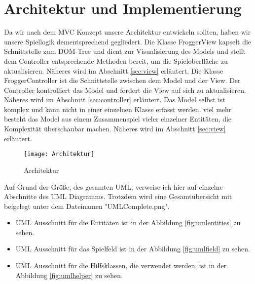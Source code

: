 \documentclass[a4paper,10pt]{report}
\begin{document}

    \chapter{Architektur und Implementierung}
     
	Da wir nach dem MVC Konzept unsere Architektur entwickeln sollten, haben wir unsere Spiellogik dementsprechend gegliedert. 
	\newline \newline	
	Die Klasse FroggerView kapselt die Schnittstelle zum DOM-Tree und dient zur Visualisierung des Models und stellt dem Controller 
	entsprechende Methoden bereit, um die Spieloberfläche zu aktualisieren. Näheres wird im Abschnitt \ref{sec:view} erläutert.
    \newline \newline	
	Die Klasse FroggerController ist die Schnittstelle zwischen dem Model und der View. Der Controller kontrolliert das Model und fordert 
	die View auf sich zu aktualisieren. Näheres wird im Abschnitt \ref{sec:controller} erläutert.
	\newline \newline 
	Das Model selbst ist komplex und kann nicht in einer einzelnen Klasse erfasst werden, viel mehr besteht das Model aus einem Zusammenspiel vieler einzelner Entitäten,
	die Komplexität überschaubar machen. Näheres wird im Abschnitt \ref{sec:view} erläutert.

     \begin{figure}			
		\texttt{[image: Architektur]}
		\caption{Architektur}
		\label{fig:architektur}
	\end{figure}    
    
    \newpage
    \noindent
	Auf Grund der Größe, des gesamten UML, verweise ich hier auf einzelne Abschnitte des UML Diagramms. Trotzdem wird eine Gesamtübersicht mit beigelegt unter dem Dateinamen "UMLComplete.png".
	
	\begin{itemize}
		\item UML Ausschnitt für die Entitäten ist in der Abbildung \ref{fig:umlentities} zu sehen.
		\item UML Ausschnitt für das Spielfeld ist in der Abbildung \ref{fig:umlfield} zu sehen.
		\item UML Ausschnitt für die Hilfsklassen, die verwendet werden, ist in der Abbildung \ref{fig:umlhelper} zu sehen.
	\end{itemize}	    
    
\end{document}
